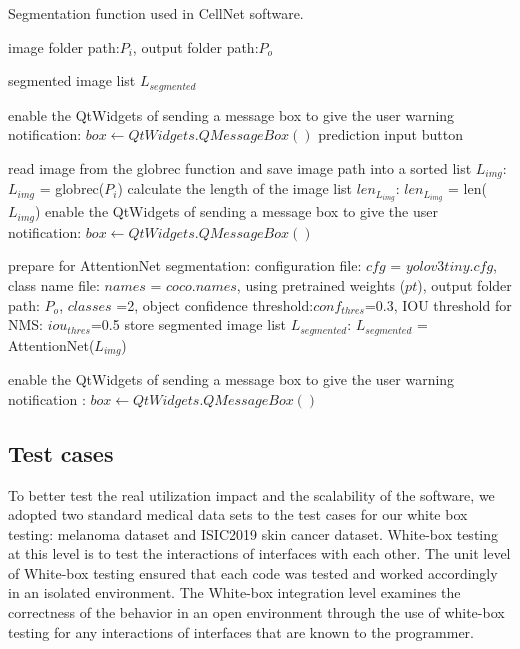 \begin{algorithm}[t]
  \caption{Segmentation function used in CellNet software.}
  \label{alg:Framwork}
  \begin{algorithmic}[1]
    \Require
    image folder path:$P_{i}$, output folder path:$P_{o}$
    
    \Ensure
     segmented image list $L_{segmented}$
  
      
      \State  enable the QtWidgets of sending a message box to give the user warning notification: $box  \gets QtWidgets.QMessageBox()$
      \State  \set prediction input button \false
      
    \Else
      \State  read image from the globrec function and save image path into a sorted list $L_{img}$: $L_{img}$ = globrec($P_{i}$)
      \State  calculate the length of the image list $len_{L_{img}}$: $len_{L_{img}}$ = len($L_{img}$)
      \State  enable the QtWidgets of sending a message box to give the user notification: $box  \gets QtWidgets.QMessageBox()$
    
      \State  prepare for AttentionNet segmentation: \newline configuration file: $cfg$ = $yolov3tiny.cfg$, class name file: $names$ = $coco.names$, using pretrained weights ($pt$), output folder path: $P_{o}$, $classes$ =2, object confidence threshold:$conf_{thres}$=0.3, IOU threshold for NMS: $iou_{thres}$=0.5
      \State  store segmented image list $L_{segmented}$: $L_{segmented}$ = AttentionNet($L_{img}$)
      
      \State  enable the QtWidgets of sending a message box to give the user warning notification : $box  \gets QtWidgets.QMessageBox()$
      
    \EndIf \newline
  \end{algorithmic}
\end{algorithm}



\subsection{Test cases} %
\label{sub:amet}

To better test the real utilization impact and the scalability of the software, we adopted two standard medical data sets to the test cases for our white box testing: melanoma dataset and ISIC2019 skin cancer dataset.
White-box testing at this level is to test the interactions of interfaces with each other. The unit level of White-box testing ensured that each code was tested and worked accordingly in an isolated environment. The White-box integration level examines the correctness of the behavior in an open environment through the use of white-box testing for any interactions of interfaces that are known to the programmer.

